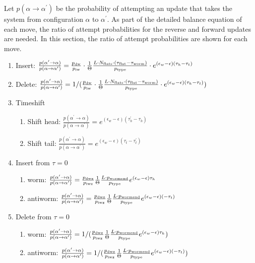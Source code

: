 \documentclass[12pt, two sided]{article}
\begin{document}
	Let $p(\alpha\to\alpha^\prime)$ be the probability of attempting an update that takes the system from configuration $\alpha$ to $\alpha^\prime$. As part of the detailed balance equation of each move, the ratio of attempt probabilities for the reverse and forward updates are needed. In this section, the ratio of attempt probabilities are shown for each move.
	\begin{enumerate}
	\setcounter{enumi}{0}
		\item Insert: $\frac{p(\alpha^\prime\to\alpha)}{p(\alpha\to\alpha^\prime)} = \frac{p_{\rm{dw}}}{p_{\rm{iw}}} \cdot \frac{1}{\Theta} \frac{L \cdot N_{\rm{flats}} \cdot (\tau_{\rm{flat}}-\tau_{\rm{worm}})}{p_{\rm{type}}} \cdot e^{(\epsilon_w-\epsilon)(\tau_h-\tau_t)}$
		
		\item Delete: $\frac{p(\alpha^\prime\to\alpha)}{p(\alpha\to\alpha^\prime)} = 1/(\frac{p_{\rm{dw}}}{p_{\rm{iw}}} \cdot \frac{1}{\Theta}  \frac{L \cdot N_{\rm{flats}} \cdot (\tau_{\rm{flat}}-\tau_{\rm{worm}})}{p_{\rm{type}}} \cdot e^{(\epsilon_w-\epsilon)(\tau_h-\tau_t)})$
		
		\item Timeshift
		\begin{enumerate}
		\item{Shift head: $\frac{p(\alpha^\prime\to\alpha)}{p(\alpha\to\alpha^\prime)} =  e^{(\epsilon_w-\epsilon)(\tau_h^\prime-\tau_h)}$}
		\item{Shift tail: $\frac{p(\alpha^\prime\to\alpha)}{p(\alpha\to\alpha^\prime)} = e^{(\epsilon_w-\epsilon)(\tau_t-\tau_t^\prime)}$}
		\end{enumerate}
		
		\item Insert from $\tau=0$
		\begin{enumerate}
		\item{worm: $\frac{p(\alpha^\prime\to\alpha)}{p(\alpha\to\alpha^\prime)} = \frac{p_{\rm{dwz}}}{p_{\rm{iwz}}} \frac{1}{\Theta}  \frac{L \cdot p_{\rm{wormend}}}{p_{\rm{type}}} e^{(\epsilon_w-\epsilon)\tau_h}$ }
		\item{antiworm: $\frac{p(\alpha^\prime\to\alpha)}{p(\alpha\to\alpha^\prime)} = \frac{p_{\rm{dwz}}}{p_{\rm{iwz}}} \frac{1}{\Theta}  \frac{L \cdot p_{\rm{wormend}}}{p_{\rm{type}}} e^{(\epsilon_w-\epsilon)(-\tau_t)}$}
		\end{enumerate}

		\item Delete from $\tau=0$
		\begin{enumerate}
		\item{worm: $\frac{p(\alpha^\prime\to\alpha)}{p(\alpha\to\alpha^\prime)} = 1/(\frac{p_{\rm{dwz}}}{p_{\rm{iwz}}} \frac{1}{\Theta}  \frac{L \cdot p_{\rm{wormend}}}{p_{\rm{type}}} e^{(\epsilon_w-\epsilon)\tau_h})$ }
		\item{antiworm: $\frac{p(\alpha^\prime\to\alpha)}{p(\alpha\to\alpha^\prime)}=1/(\frac{p_{\rm{dwz}}}{p_{\rm{iwz}}} \frac{1}{\Theta}  \frac{L \cdot p_{\rm{wormend}}}{p_{\rm{type}}} e^{(\epsilon_w-\epsilon)(-\tau_t)})$}
		\end{enumerate}
		

\end{enumerate}
\end{document}
